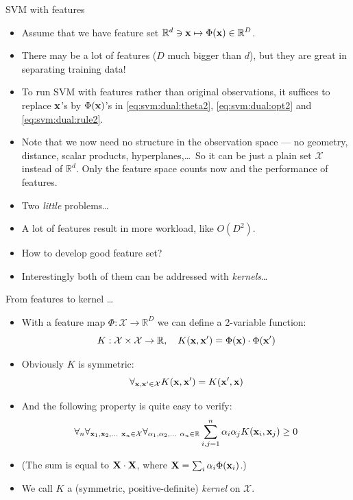 \documentclass[handout]{beamer}   %
\def\R{\mathbb{R}}
\def\X{\mathcal{X}}
\def\b#1{{\bf #1}}
\begin{document}
\begin{frame}{SVM with features}
  \begin{itemize}[<+->]
  \item Assume that we have feature set $\R^d\ni\b x\mapsto \Phi(\b x)\in\R^D$.
  \item There may be a lot of features ($D$ much bigger than $d$), but they are great in separating training data!
  \item To run SVM with features rather than original observations, it suffices
    to replace $\b x$'s by $\Phi(\b x)$'s in
    \eqref{eq:svm:dual:theta2}, \eqref{eq:svm:dual:opt2} and \eqref{eq:svm:dual:rule2}.
  \item Note that we now need no structure in the observation space --- no
    geometry, distance, scalar products, hyperplanes,\dots\ So it can be just a plain set $\X$ instead of $\R^d$.
    Only the feature space counts now and the performance of features.
  \item Two {\it little\/} problems\dots
  \item A lot of features result in more workload, like $O(D^2)$.
  \item How to develop good feature set?
  \item Interestingly both of them can be addressed with {\it kernels}\dots
  \end{itemize}
\end{frame}


\begin{frame}{From features to kernel \dots}
  \begin{itemize}[<+->]
  \item With a feature map $\Phi:\X\to\R^D$ we can define a 2-variable function:
    \begin{equation}
      \label{eq:kernel:fromfeatures}
      K:\X\times\X\to\R,\quad K(\b x, \b x')=\Phi(\b x)\cdot\Phi(\b x')
    \end{equation}
  \item Obviously $K$ is symmetric: 
    \begin{equation}
      \label{eq:kernel:symmetry}
      \forall_{\b x, \b x' \in\X} K(\b x, \b x') = K(\b x', \b x)
    \end{equation}
  \item And the following property is quite easy to verify:
    \begin{equation}
      \label{eq:kernel:positive}
      \forall_n \forall_{\b x_1,\b x_2,\ldots\ \b x_n\in\X}
      \forall_{\alpha_1,\alpha_2,\ldots\ \alpha_n\in\R}
      \sum_{i,j=1}^n \alpha_i\alpha_jK(\b x_i,\b x_j) \ge 0
    \end{equation}
  \item (\/The sum is equal to $\b X\cdot\b X$, where $\b X=\sum_i\alpha_i\Phi(\b x_i)$.\/)
  \item We call $K$ a (symmetric, positive-definite) {\it kernel\/} on $\X$.
  \end{itemize}
\end{frame}
\def\iskernel{(\ref{eq:kernel:symmetry}-\ref{eq:kernel:positive})}
\end{document}
